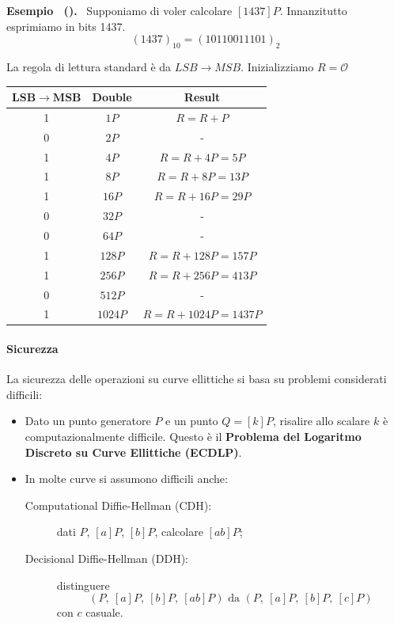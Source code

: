 \documentclass[a4paper, 11pt]{article}
\newenvironment{example}[1][]{
  \par\noindent\textbf{Esempio%
  \if\relax\detokenize{#1}\relax\else\ (\textbf{#1})\fi.}\ }{}
\begin{document}
\begin{example}
    Supponiamo di voler calcolare $[1437]P$. Innanzitutto esprimiamo in bits 1437.
    \[
        (1437)_{10} = (10110011101)_2
    \]

    La regola di lettura standard è da $LSB \to MSB$.
    Inizializziamo $R = \mathcal{O}$
    \begin{center}
        \begin{tabular}{ |c|c|c| } 
        \hline
        $\mathbf{LSB \to MSB}$ & \textbf{Double} & \textbf{Result} \\ 
        \hline
        1 & $1P$ & $R = R + P$ \\
        \hline
        0 & $2P$ & - \\
        \hline
        1 & $4P$ & $R = R + 4P = 5P$ \\
        \hline
        1 & $8P$ & $R = R + 8P = 13P$ \\
        \hline
        1 & $16P$ & $R = R + 16P = 29P$ \\
        \hline
        0 & $32P$ & - \\
        \hline
        0 & $64P$ & - \\
        \hline
        1 & $128P$ & $R = R + 128P = 157P$ \\
        \hline
        1 & $256P$ & $R = R + 256P = 413P$ \\
        \hline
        0 & $512P$ & - \\
        \hline
        1 & $1024P$ & $R = R + 1024P = 1437P$ \\
        \hline    
        \end{tabular}
    \end{center}
\end{example}

\paragraph{Sicurezza}
La sicurezza delle operazioni su curve ellittiche si basa su problemi considerati difficili:
\begin{itemize}
    \item Dato un punto generatore $P$ e un punto $Q=[k]P$, risalire allo scalare $k$ è computazionalmente difficile. Questo è il \textbf{Problema del Logaritmo Discreto su Curve Ellittiche (ECDLP)}.
    \item In molte curve si assumono difficili anche:
        \begin{description}
            \item[Computational Diffie-Hellman (CDH):] dati $P$, $[a]P$, $[b]P$, calcolare $[ab]P$;
            \item[Decisional Diffie-Hellman (DDH):] distinguere 
            \[
            (P,\ [a]P,\ [b]P,\ [ab]P) \text{ da } (P,\ [a]P,\ [b]P,\ [c]P)
            \]
            con $c$ casuale.
        \end{description}
\end{itemize}
\end{document}
